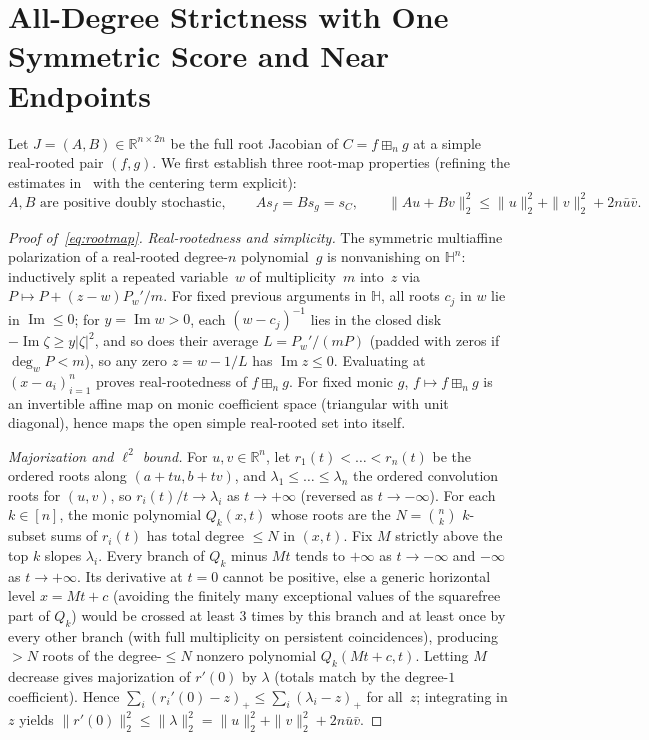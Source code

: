 \documentclass[11pt]{article}
\theoremstyle{plain}
\theoremstyle{definition}
\theoremstyle{remark}
\begin{document}
\section{All-Degree Strictness with One Symmetric Score and Near Endpoints}

Let $J = (A,B) \in \mathbb{R}^{n \times 2n}$ be the full root Jacobian of $C = f \boxplus_n g$ at a simple real-rooted pair $(f,g)$. We first establish three root-map properties (refining the estimates in~\cite{GVS2026} with the centering term explicit):
\begin{equation}\label{eq:rootmap}
A, B \text{ are positive doubly stochastic}, \qquad
A s_f = B s_g = s_C, \qquad
\|A u + B v\|_2^2 \le \|u\|_2^2 + \|v\|_2^2 + 2n \bar{u}\bar{v}.
\end{equation}

\begin{proof}[Proof of~\eqref{eq:rootmap}]
\emph{Real-rootedness and simplicity.} The symmetric multiaffine polarization of a real-rooted degree-$n$ polynomial~$g$ is nonvanishing on $\mathbb{H}^n$: inductively split a repeated variable~$w$ of multiplicity~$m$ into~$z$ via $P \mapsto P + (z-w) P_w'/m$. For fixed previous arguments in $\mathbb{H}$, all roots $c_j$ in $w$ lie in $\operatorname{Im} \le 0$; for $y = \operatorname{Im} w > 0$, each $(w-c_j)^{-1}$ lies in the closed disk $-\operatorname{Im} \zeta \ge y|\zeta|^2$, and so does their average $L = P_w'/(mP)$ (padded with zeros if $\deg_w P < m$), so any zero $z = w - 1/L$ has $\operatorname{Im} z \le 0$. Evaluating at $(x - a_i)_{i=1}^n$ proves real-rootedness of $f \boxplus_n g$. For fixed monic $g$, $f \mapsto f \boxplus_n g$ is an invertible affine map on monic coefficient space (triangular with unit diagonal), hence maps the open simple real-rooted set into itself.

\emph{Majorization and $\ell^2$ bound.} For $u,v \in \mathbb{R}^n$, let $r_1(t) < \dots < r_n(t)$ be the ordered roots along $(a+tu, b+tv)$, and $\lambda_1 \le \dots \le \lambda_n$ the ordered convolution roots for $(u,v)$, so $r_i(t)/t \to \lambda_i$ as $t \to +\infty$ (reversed as $t \to -\infty$). For each $k \in [n]$, the monic polynomial $Q_k(x,t)$ whose roots are the $N = \binom{n}{k}$ $k$-subset sums of $r_i(t)$ has total degree $\le N$ in $(x,t)$. Fix $M$ strictly above the top $k$ slopes $\lambda_i$. Every branch of $Q_k$ minus $Mt$ tends to $+\infty$ as $t \to -\infty$ and $-\infty$ as $t \to +\infty$. Its derivative at $t = 0$ cannot be positive, else a generic horizontal level $x = Mt + c$ (avoiding the finitely many exceptional values of the squarefree part of $Q_k$) would be crossed at least $3$ times by this branch and at least once by every other branch (with full multiplicity on persistent coincidences), producing $> N$ roots of the degree-$\le N$ nonzero polynomial $Q_k(Mt+c, t)$. Letting $M$ decrease gives majorization of $r'(0)$ by $\lambda$ (totals match by the degree-$1$ coefficient). Hence $\sum_i (r_i'(0)-z)_+ \le \sum_i (\lambda_i - z)_+$ for all~$z$; integrating in $z$ yields $\|r'(0)\|_2^2 \le \|\lambda\|_2^2 = \|u\|_2^2 + \|v\|_2^2 + 2n\bar{u}\bar{v}$.


\end{proof}
\end{document}
